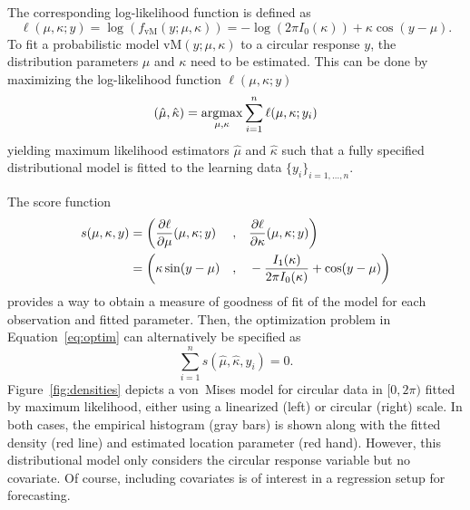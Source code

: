 \documentclass{statsoc}
\newcommand{\argmax}{\operatorname{argmax}\displaylimits}
\begin{document}
The corresponding log-likelihood function is defined as
\begin{equation}
    \ell(\mu, \kappa; y) = \log(f_\mathrm{vM}(y;\mu, \kappa))
    = -\log(2 \pi I_0(\kappa)) + \kappa \cos(y - \mu).\label{equ:vM:loglik}
\end{equation}
To fit a probabilistic model $\text{vM}(y; \mu, \kappa)$ to a circular response
$y$, the distribution parameters $\mu$ and $\kappa$ need to be estimated. This
can be done by maximizing the log-likelihood function $\ell(\mu, \kappa; y)$
\begin{equation}\label{eq:optim}
  (\hat{\mu},\hat{\kappa}) = \argmax_{\mu,\kappa} \sum_{i=1}^n \ell(\mu, \kappa; y_i) 
\end{equation}
yielding maximum likelihood estimators $\hat{\mu}$ and $\hat{\kappa}$ such that
a fully specified distributional model is fitted to the learning data
$\{y_i\}_{i=1,\ldots,n}$.

The score function
\begin{equation}
  \label{eq:scores}
  \begin{aligned}
    s(\mu, \kappa, y) &= \bigg(\frac{\partial \ell}{\partial \mu}(\mu,\kappa; y)
    \smallskip &,
    \quad & \frac{\partial \ell}{\partial \kappa}(\mu,\kappa; y) \bigg) 
    \\
    &= \bigg(\kappa \sin(y-\mu)
    \smallskip &,
    \quad &-\frac{I_1(\kappa)}{2\pi I_0(\kappa)}+\cos(y-\mu) \bigg)
  \end{aligned}
\end{equation}
provides a way to obtain a measure of goodness of fit of the model for each
observation and fitted parameter. Then, the optimization problem in
Equation~\ref{eq:optim} can alternatively be specified as 
\begin{equation}
  \sum_{i = 1}^n s(\hat{\mu}, \hat{\kappa}, y_i) = 0.
\end{equation}
Figure~\ref{fig:densities} depicts a von~Mises model for circular data in $[0, 2
\pi)$ fitted by maximum likelihood, either using a linearized (left) or
circular (right) scale. In both cases, the empirical histogram (gray bars) is
shown along with the fitted density (red line) and estimated location parameter
(red hand). However, this distributional model only considers the circular
response variable but no covariate. Of course, including covariates is of
interest in a regression setup for forecasting.
\end{document}
